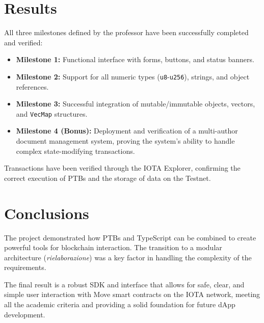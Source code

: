 \documentclass[12pt,a4paper]{article}
\begin{document}
\section{Results}

All three milestones defined by the professor have been successfully completed and verified:
\begin{itemize}
    \item \textbf{Milestone 1:} Functional interface with forms, buttons, and status banners.
    \item \textbf{Milestone 2:} Support for all numeric types (\texttt{u8}-\texttt{u256}), strings, and object references.
    \item \textbf{Milestone 3:} Successful integration of mutable/immutable objects, vectors, and \texttt{VecMap} structures.
    \item \textbf{Milestone 4 (Bonus):} Deployment and verification of a multi-author document management system, proving the system's ability to handle complex state-modifying transactions.
\end{itemize}

Transactions have been verified through the IOTA Explorer, confirming the correct execution of PTBs and the storage of data on the Testnet.

\section{Conclusions}

The project demonstrated how PTBs and TypeScript can be combined to create powerful tools for blockchain interaction. The transition to a modular architecture (\textit{rielaborazione}) was a key factor in handling the complexity of the requirements.

The final result is a robust SDK and interface that allows for safe, clear, and simple user interaction with Move smart contracts on the IOTA network, meeting all the academic criteria and providing a solid foundation for future dApp development.

\end{document}
